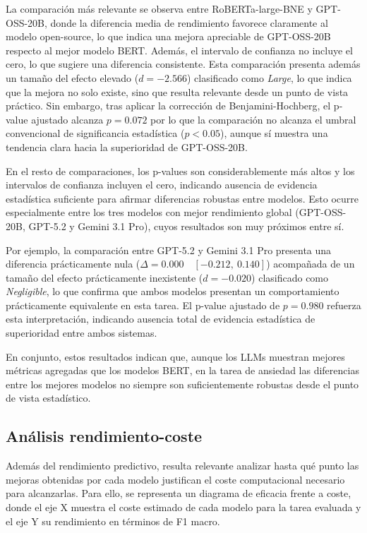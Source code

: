 La comparación más relevante se observa entre RoBERTa-large-BNE y GPT-OSS-20B, donde la diferencia media de rendimiento favorece claramente al modelo open-source, lo que indica una mejora apreciable de GPT-OSS-20B respecto al mejor modelo BERT. Además, el intervalo de confianza no incluye el cero, lo que sugiere una diferencia consistente. Esta comparación presenta además un tamaño del efecto elevado ($d = -2.566$) clasificado como \textit{Large}, lo que indica que la mejora no solo existe, sino que resulta relevante desde un punto de vista práctico. Sin embargo, tras aplicar la corrección de Benjamini-Hochberg, el p-value ajustado alcanza $p = 0.072$ por lo que la comparación no alcanza el umbral convencional de significancia estadística ($p < 0.05$), aunque sí muestra una tendencia clara hacia la superioridad de GPT-OSS-20B.

En el resto de comparaciones, los p-values son considerablemente más altos y los intervalos de confianza incluyen el cero, indicando ausencia de evidencia estadística suficiente para afirmar diferencias robustas entre modelos. Esto ocurre especialmente entre los tres modelos con mejor rendimiento global (GPT-OSS-20B, GPT-5.2 y Gemini 3.1 Pro), cuyos resultados son muy próximos entre sí.

Por ejemplo, la comparación entre GPT-5.2 y Gemini 3.1 Pro presenta una diferencia prácticamente nula ($\Delta = 0.000 \quad [-0.212,\ 0.140]$) acompañada de un tamaño del efecto prácticamente inexistente ($d = -0.020$) clasificado como \textit{Negligible}, lo que confirma que ambos modelos presentan un comportamiento prácticamente equivalente en esta tarea. El p-value ajustado de $p = 0.980$ refuerza esta interpretación, indicando ausencia total de evidencia estadística de superioridad entre ambos sistemas.

En conjunto, estos resultados indican que, aunque los LLMs muestran mejores métricas agregadas que los modelos BERT, en la tarea de ansiedad las diferencias entre los mejores modelos no siempre son suficientemente robustas desde el punto de vista estadístico.

\subsection{Análisis rendimiento-coste}

Además del rendimiento predictivo, resulta relevante analizar hasta qué punto las mejoras obtenidas por cada modelo justifican el coste computacional necesario para alcanzarlas. Para ello, se representa un diagrama de eficacia frente a coste, donde el eje X muestra el coste estimado de cada modelo para la tarea evaluada y el eje Y su rendimiento en términos de F1 macro.

